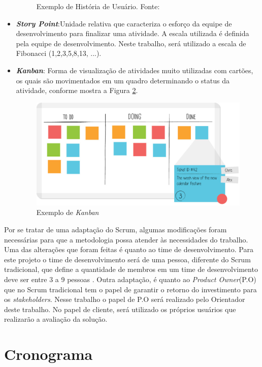 \begin{itemize}
\begin{figure}[H]
\caption{Exemplo de História de Usuário. Fonte: \cite{sabbagh_scrum:_2014}}
\label{img:us}
\end{figure}
\item \textit{\textbf{Story Point}}:Unidade relativa que caracteriza o esforço da equipe de desenvolvimento para finalizar uma atividade. A escala utilizada é definida pela equipe de desenvolvimento. Neste trabalho, será utilizado a escala de Fibonacci (1,2,3,5,8,13, ...). 
\item \textit{\textbf{Kanban}}: Forma de visualização de atividades muito utilizadas com cartões, os quais são movimentados em um quadro determinando o status da atividade, conforme mostra a Figura \ref{img:kanban}.
\graphicspath{{figuras/}}
\begin{figure}[H]
\centering
\includegraphics[scale=0.40]{kanban}
\caption{Exemplo de \textit{Kanban}}
\label{img:kanban}
\end{figure}

\end{itemize}

Por se tratar de uma adaptação do Scrum, algumas modificações foram necessárias para que a metodologia possa atender às necessidades do trabalho. Uma das alterações que foram feitas é quanto ao time de desenvolvimento. Para este projeto o time de desenvolvimento será de uma pessoa, diferente do Scrum tradicional, que define a quantidade de membros em um time de desenvolvimento deve ser entre 3 a 9 pessoas \cite{sabbagh_scrum:_2014}. Outra adaptação, é quanto ao \textit{Product Owner}(P.O) que no Scrum tradicional tem o papel de garantir o retorno do investimento para os \textit{stakeholders}. Nesse trabalho o papel de P.O será realizado pelo Orientador deste trabalho. No papel de cliente, será utilizado os próprios usuários que realizarão a avaliação da solução.


\section{Cronograma}
\label{cronograma}

